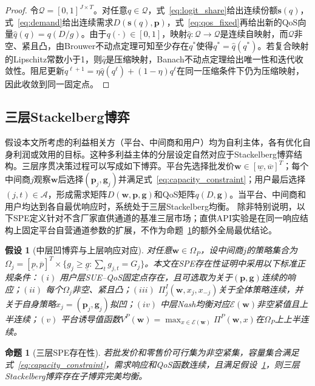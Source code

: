 \documentclass[UTF8,11pt]{ctexart}
\newtheorem{proposition}{命题}
\newtheorem{assumption}{假设}
\newcommand{\qos}{q}
\newcommand{\A}{\mathcal{A}}
\newcommand{\D}{D}
\newcommand{\w}{\boldsymbol{w}}
\newcommand{\p}{\boldsymbol{p}}
\newcommand{\g}{\boldsymbol{g}}
\begin{document}
\begin{proof}
令$\mathcal{Q}=[0,1]^{J\times T}$。对任意$q\in\mathcal{Q}$，式~\eqref{eq:logit_share}给出连续份额$\boldsymbol{s}(q)$，式~\eqref{eq:demand}给出连续需求$\D(\boldsymbol{s}(q),\p)$，式~\eqref{eq:qos_fixed}再给出新的QoS向量$\widehat q(q)=\qos(\D/g)$。由于$\qos(\cdot)\in[0,1]$，映射$\widehat q:\mathcal{Q}\to\mathcal{Q}$是连续自映射，而$\mathcal{Q}$非空、紧且凸，由Brouwer不动点定理可知至少存在$q^*$使得$q^*=\widehat q(q^*)$。若复合映射的Lipschitz常数小于1，则$\widehat q$是压缩映射，Banach不动点定理给出唯一性和迭代收敛性。阻尼更新$q^{\ell+1}=\eta\widehat q(q^\ell)+(1-\eta)q^\ell$在同一压缩条件下仍为压缩映射，因此收敛到同一固定点。
\end{proof}

\subsection{三层Stackelberg博弈}
\label{sec:three_level_game}

假设本文所考虑的利益相关方（平台、中间商和用户）均为自利主体，各有优化自身利润或效用的目标。这种多利益主体的分层设定自然对应于Stackelberg博弈结构。三层序贯决策过程可以写成如下博弈。平台先选择批发价$\w\in[\underline w,\overline w]^T$；每个中间商$j$观察$\w$后选择$(\p_j,\g_j)$并满足式~\eqref{eq:capacity_constraint}；用户最后选择$(j,t)\in\A$，形成需求矩阵$\D(\w,\p,\g)$和QoS矩阵$q(\D,\g)$。当平台、中间商和用户均达到各自最优响应时，系统处于三层Stackelberg均衡。
除非特别说明，以下SPE定义针对不含厂家直供通道的基准三层市场；直供API实验是在同一响应结构上固定平台自营通道参数的扩展，不作为命题~\ref{prop:spe}的额外全局最优结论。

\begin{assumption}[中层凹博弈与上层响应对应]
\label{assump:spe_regular}
对任意$\w\in\Omega_P$，设中间商$j$的策略集合为$\Omega_j=[\underline p,\overline p]^T\times\{g_j\ge\underline g:\sum_t g_{j,t}=G_j\}$。本文在SPE存在性证明中采用以下标准正规条件：$(i)$ 用户层SUE--QoS固定点存在，且可选取为关于$(\p,\g)$连续的响应；$(ii)$ 每个$\Omega_j$非空、紧且凸；$(iii)$ $\Pi^I_j(\w,x_j,x_{-j})$关于全体策略连续，并关于自身策略$x_j=(\p_j,\g_j)$拟凹；$(iv)$ 中层Nash均衡对应$\mathcal{E}(\w)$非空紧值且上半连续；$(v)$ 平台诱导值函数$V^P(\w)=\max_{x\in\mathcal{E}(\w)}\Pi^P(\w,x)$在$\Omega_P$上上半连续。
\end{assumption}

\begin{proposition}[三层SPE存在性]
\label{prop:spe}
若批发价和零售价可行集为非空紧集，容量集合满足式~\eqref{eq:capacity_constraint}，需求响应和QoS函数连续，且满足假设~\ref{assump:spe_regular}，则三层Stackelberg博弈存在子博弈完美均衡。
\end{proposition}
\end{document}

